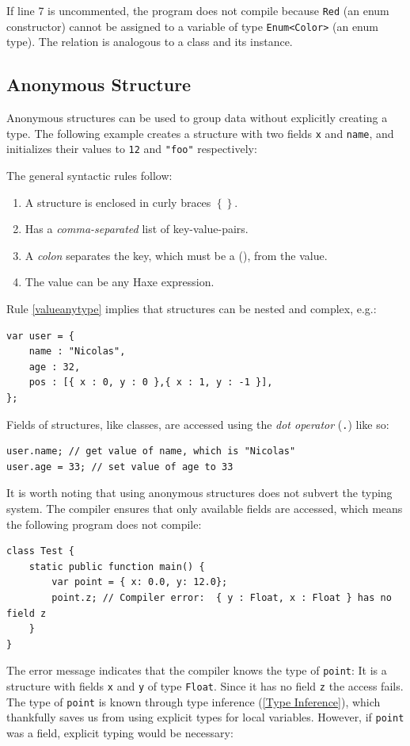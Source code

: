 \documentclass{article}
\newcommand{\type}[1]{\texttt{#1}}
\newcommand{\expr}[1]{\texttt{#1}}
\newcommand{\Fullref}[1]{\nameref{#1} (\Cref{#1})}
\newcommand{\tref}[2]{#1 (\ref{#2})}
\newcommand{\haxe}[2][]{%
}
\begin{document}
\haxe{assets/EnumUnification.hx}
If line 7 is uncommented, the program does not compile because \expr{Red} (an enum constructor) cannot be assigned to a variable of type \type{Enum<Color>} (an enum type). The relation is analogous to a class and its instance.



\subsection{Anonymous Structure}
\label{Anonymous Structure}

Anonymous structures can be used to group data without explicitly creating a type. The following example creates a structure with two fields \expr{x} and \expr{name}, and initializes their values to \expr{12} and \expr{"foo"} respectively:

\haxe{assets/Structure.hx}
The general syntactic rules follow:

\begin{enumerate}
	\item A structure is enclosed in curly braces \expr{$\left\{\right\}$}. 
	\item Has a \emph{comma-separated} list of key-value-pairs.
	\item A \emph{colon} separates the key, which must be a \Fullref{Valid Identifier}, from the value.
	\item\label{valueanytype} The value can be any Haxe expression.
\end{enumerate}
Rule \ref{valueanytype} implies that structures can be nested and complex, e.g.:

\begin{lstlisting}
var user = {
    name : "Nicolas",
    age : 32,
    pos : [{ x : 0, y : 0 },{ x : 1, y : -1 }],
};
\end{lstlisting}
Fields of structures, like classes, are accessed using the \emph{dot operator} (\expr{.}) like so:

\begin{lstlisting}
user.name; // get value of name, which is "Nicolas"
user.age = 33; // set value of age to 33
\end{lstlisting}
It is worth noting that using anonymous structures does not subvert the typing system. The compiler ensures that only available fields are accessed, which means the following program does not compile:

\begin{lstlisting}
class Test {
	static public function main() {
		var point = { x: 0.0, y: 12.0};
		point.z; // Compiler error:  { y : Float, x : Float } has no field z
	}
}
\end{lstlisting}
The error message indicates that the compiler knows the type of \expr{point}: It is a structure with fields \expr{x} and \expr{y} of type \type{Float}. Since it has no field \expr{z} the access fails.
The type of \expr{point} is known through \tref{type inference}{Type Inference}, which thankfully saves us from using explicit types for local variables. However, if \expr{point} was a field, explicit typing would be necessary:
\end{document}
